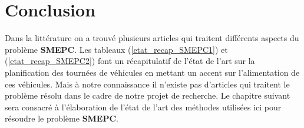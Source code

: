 




\section{Conclusion}
Dans la littérature on a trouvé plusieurs articles qui traitent différents aspects du problème \textbf{SMEPC}.
Les tableaux (\ref{etat_recap_SMEPC1}) et (\ref{etat_recap_SMEPC2}) font un récapitulatif de l'état de l'art sur la planification des tournées de véhicules en mettant un accent sur l'alimentation de ces véhicules. Mais à notre connaissance il n'existe pas d'articles qui traitent le problème résolu dans le cadre de notre projet de recherche. Le chapitre suivant sera consacré à l'élaboration de l'état de l'art des méthodes utilisées ici pour résoudre le problème \textbf{SMEPC}.



